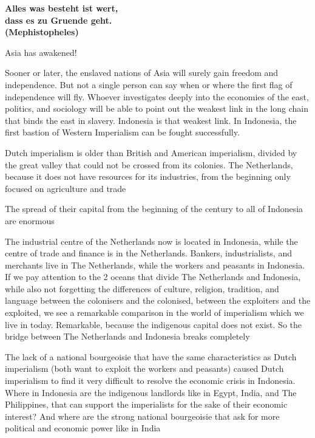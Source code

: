 \begin{center}
    \textbf{Alles was besteht ist wert,\\
    dass es zu Gruende geht.\\
    (Mephistopheles)}\nline
\end{center}

Asia has awakened! \nline

Sooner or later, the enslaved nations of Asia will surely gain freedom and independence. 
But not a single person can say when or where the first flag of independence will fly. 
Whoever investigates deeply into the economies of the east, politics, and sociology will 
be able to point out the weakest link in the long chain that binds the east in slavery. Indonesia is that weakest link. 
In Indonesia, the first bastion of Western Imperialism can be fought successfully. \nline

Dutch imperialism is older than British and American imperialism, divided by the great valley that could not be crossed from its colonies. 
The Netherlands, because it does not have resources for its industries, from the beginning only focused on agriculture and trade\nline

The spread of their capital from the beginning of the century to all of Indonesia are enormous\nline

The industrial centre of the Netherlands now is located in Indonesia, while the centre of trade and finance is in the Netherlands. 
Bankers, industrialists, and merchants live in The Netherlands, while the workers and peasants in Indonesia. 
If we pay attention to the 2 oceans that divide The Netherlands and Indonesia, while also not forgetting the differences of 
culture, religion, tradition, and language between the colonisers and the colonised, between the exploiters and the exploited,
we see a remarkable comparison in the world of imperialism which we live in today. Remarkable, because the indigenous capital 
does not exist. So the bridge between The Netherlands and Indonesia breaks completely\nline

The lack of a national bourgeoisie that have the same characteristics as Dutch imperialism 
(both want to exploit the workers and peasants) caused Dutch imperialism to find it 
very difficult to resolve the economic crisis in Indonesia. Where in Indonesia are the 
indigenous landlords like in Egypt, India, and The Philippines, that can support the imperialists 
for the sake of their economic interest? And where are the strong national bourgeoisie that ask 
for more political and economic power like in India\nline

